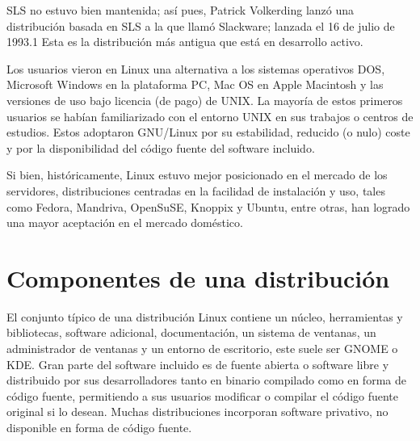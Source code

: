 SLS no estuvo bien mantenida; así pues, Patrick Volkerding lanzó una distribución basada en SLS a la que llamó Slackware; lanzada el 16 de julio de 1993.1 Esta es la distribución más antigua que está en desarrollo activo.

Los usuarios vieron en Linux una alternativa a los sistemas operativos DOS, Microsoft Windows en la plataforma PC, Mac OS en Apple Macintosh y las versiones de uso bajo licencia (de pago) de UNIX. La mayoría de estos primeros usuarios se habían familiarizado con el entorno UNIX en sus trabajos o centros de estudios. Estos adoptaron GNU/Linux por su estabilidad, reducido (o nulo) coste y por la disponibilidad del código fuente del software incluido.

Si bien, históricamente, Linux estuvo mejor posicionado en el mercado de los servidores, distribuciones centradas en la facilidad de instalación y uso, tales como Fedora, Mandriva, OpenSuSE, Knoppix y Ubuntu, entre otras, han logrado una mayor aceptación en el mercado doméstico.

\section{Componentes de una distribución}
El conjunto típico de una distribución Linux contiene un núcleo, herramientas y bibliotecas, software adicional, documentación, un sistema de ventanas, un administrador de ventanas y un entorno de escritorio, este suele ser GNOME o KDE. Gran parte del software incluido es de fuente abierta o software libre y distribuido por sus desarrolladores tanto en binario compilado como en forma de código fuente, permitiendo a sus usuarios modificar o compilar el código fuente original si lo desean. Muchas distribuciones incorporan software privativo, no disponible en forma de código fuente.

